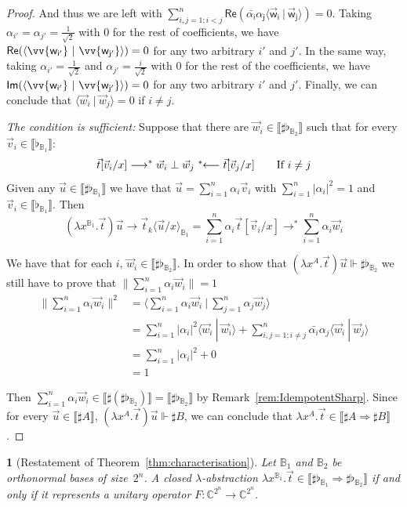 \documentclass[a4paper,UKenglish,numberwithinsect,pdfa,anonymous]{lipics-v2021}
\theoremstyle{restatestyle}
\newtheorem*{restatetheorem}{}
\newcommand\Rpart[1]{\mathsf{Re(#1)}}
\newcommand\Ipart[1]{\mathsf{Im(#1)}}
\newcommand\lra{\longrightarrow}
\newcommand\ansubst[2]{\ensuremath{\langle #1 \rangle_{#2}}}
\def\C{\mathbb{C}}            %
\def\scal#1#2{\langle{#1}~|~{#2}\rangle}
\def\Lam#1#2#3{\lambda#1^{#2}{.}#3} %
\def\eval{\lra^*}
\def\lave{\mathrel{\reflectbox{$\eval$}}}
\def\BB{\mathbb{B}}
\def\Arr{\Rightarrow}
\def\sem#1{\llbracket#1\rrbracket}
\def\real{\Vdash}
\newcommand\basis[1]{\ensuremath{\flat_{#1}}}
\begin{document}
\begin{proof}
  And thus we are left with $\sum_{i,j=1; i<j}^n \Rpart{\bar{\alpha_i}\alpha_j \scal{\vec{w}_{i}}{\vec{w}_{j}}} = 0$. Taking $\alpha_{i'} = \alpha_{j'} = \frac{1}{\sqrt{2}}$ with $0$ for the rest of coefficients, we have $\Rpart{\scal{\vv{w_{i'}}}{\vv{w_{j'}}}} = 0$ for any two arbitrary $i'$ and $j'$. In the same way, taking $\alpha_{i'} = \frac{1}{\sqrt{2}}$ and $\alpha_{j'}=\frac{i}{\sqrt{2}}$ with $0$ for the rest of the coefficients, we have $\Ipart{\scal{\vv{w_{i'}}}{\vv{w_{j'}}}} = 0$ for any two arbitrary $i'$ and $j'$. Finally, we can conclude that $\scal{\vec{w}_{i}}{\vec{w}_{j}}=0$ if $i\neq j$.

  \textit{The condition is sufficient:} Suppose that there are $\vec{w}_{i}\in\sem{\sharp\basis{\BB_2}}$ such that for every $\vec{v}_{i}\in\sem{\basis{\BB_1}}$:
  \[
    \vec t[\vec{v}_{i}/x] \eval \vec{w}_{i} \perp \vec{w}_{j} \lave \vec t[\vec{v}_{j}/x]\qquad \text{If } i\neq j
  \]
  Given any $\vec u\in\sem{\sharp\basis{\BB_1}}$ we have that $\vec u = \sum_{i=1}^n \alpha_i \vec{v}_{i}$ with $\sum_{i=1}^n |\alpha_i|^2 = 1$ and $\vec{v}_{i}\in\sem{\basis{\BB_1}}$. Then 
  \[
    (\Lam{x}{{\BB_1}}{\vec t}) \vec u \lra \vec{t}_{k}\ansubst{\vec u/x}{\BB_1}=\sum_{i=1}^{n}\alpha_i \vec{t}[\vec{v}_{i}/x]\eval\sum_{i=1}^n \alpha_i\vec{w}_{i}
  \]

  We have that for each $i$, $\vec{w}_{i}\in\sem{\sharp\basis{\BB_2}}$. In order to show that $(\Lam{x}{A}{\vec t})\vec u\real\sharp\basis{\BB_2}$ we still have to prove that $\|\sum_{i=1}^n \alpha_i \vec{w}_{i}\| = 1$
  \begin{align*}
    \|\sum_{i=1}^n \alpha_i \vec{w}_{i}\|^2 &= \scal{\sum_{i=1}^n \alpha_i \vec{w}_{i}}{\sum_{j=1}^n \alpha_j \vec{w}_{j}}\\
    &=\sum_{i=1}^n |\alpha_i|^2 \scal{\vec{w}_{i}}{\vec{w}_{i} } + \sum_{i,j=1; i\neq j}^n \bar{\alpha_i}\alpha_j \scal{\vec{w}_{i}}{\vec{w}_{j}}\\
    &=\sum_{i=1}^n |\alpha_i|^2 + 0\\
    &= 1
  \end{align*}

  Then $\sum_{i=1}^n \alpha_i \vec{w}_{i}\in\sem{\sharp(\sharp\basis{\BB_2})}=\sem{\sharp\basis{\BB_2}}$ by Remark~\ref{rem:IdempotentSharp}. Since for every $\vec u\in\sem{\sharp A}$, $(\Lam{x}{A}{\vec t}) \vec u\real\sharp B$, we can conclude that $\Lam{x}{A}{\vec t}\in\sem{\sharp A\Arr\sharp B}$.\qedhere
\end{proof}

\begin{restatetheorem}[Restatement of Theorem~\ref{thm:characterisation}]
  Let $\BB_1$ and $\BB_2$ be orthonormal bases of size~$2^n$.
  A closed $\lambda$-abstraction
  $\Lam{x}{{\BB_1}}{\vec{t}}\in\sem{\sharp\basis{\BB_1}\Arr\sharp\basis{\BB_2}}$
  if and only if it represents a unitary operator
  $F:\C^{2^n}\to\C^{2^n}$.
\end{restatetheorem}
\end{document}

